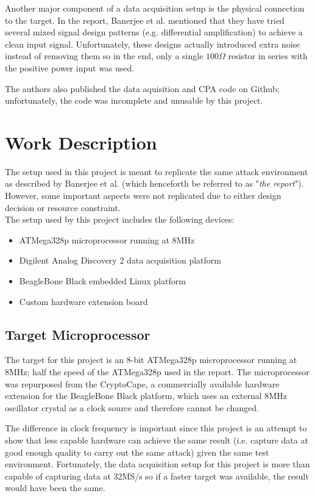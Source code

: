 \documentclass[conference]{IEEEtran}
\begin{document}
Another major component of a data acquisition setup is the physical connection to the target. In the report, Banerjee et al. mentioned that they have tried several mixed signal design patterns (e.g. differential amplification) to achieve a clean input signal. Unfortunately, these designs actually introduced extra noise instead of removing them so in the end, only a single $100\Omega$ resistor in series with the positive power input was used.

The authors also published the data aquisition and CPA code on Github; unfortunately, the code was incomplete and unusable by this project.

\section{Work Description}
The setup used in this project is meant to replicate the same attack environment as described by Banerjee et al. (which henceforth be referred to as "\textit{the report}"). However, some important aspects were not replicated due to either design decision or resource constraint.\\

\noindent The setup used by this project includes the following devices:
\begin{itemize}
\item ATMega328p microprocessor running at 8MHz
\item Digilent Analog Discovery 2 data acquisition platform
\item BeagleBone Black embedded Linux platform
\item Custom hardware extension board
\end{itemize}

\subsection{Target Microprocessor}
The target for this project is an 8-bit ATMega328p microprocessor running at 8MHz; half the speed of the ATMega328p used in the report. The microprocessor was repurposed from the CryptoCape, a commercially available hardware extension for the BeagleBone Black platform, which uses an external 8MHz oscillator crystal as a clock source and therefore cannot be changed.

The difference in clock frequency is important since this project is an attempt to show that less capable hardware can achieve the same result (i.e. capture data at good enough quality to carry out the same attack) given the same test environment. Fortunately, the data acquisition setup for this project is more than capable of capturing data at 32MS/s so if a faster target was available, the result would have been the same.
\end{document}
